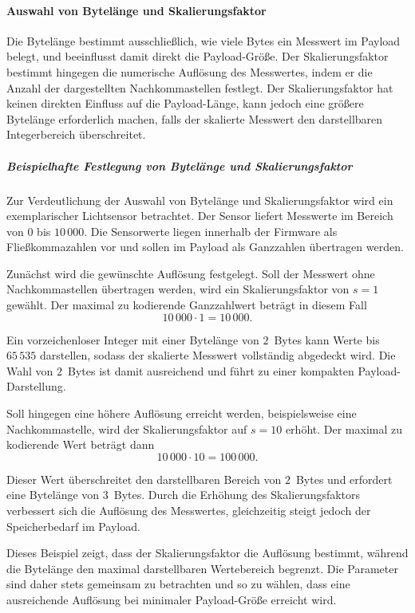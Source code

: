 \paragraph{Auswahl von Bytelänge und Skalierungsfaktor \label{data:deviceProfileConfig}}
	Die Bytelänge bestimmt ausschlie{\ss}lich, wie viele Bytes ein Messwert im Payload belegt, und beeinflusst damit direkt die Payload-Grö{\ss}e. Der Skalierungsfaktor bestimmt hingegen die numerische Auflösung des Messwertes, indem er die Anzahl der dargestellten Nachkommastellen festlegt. Der Skalierungsfaktor hat keinen direkten Einfluss auf die Payload-Länge, kann jedoch eine grö{\ss}ere Bytelänge erforderlich machen, falls der skalierte Messwert den darstellbaren Integerbereich überschreitet.

\subparagraph{Beispielhafte Festlegung von Bytelänge und Skalierungsfaktor}

	Zur Verdeutlichung der Auswahl von Bytelänge und Skalierungsfaktor wird ein exemplarischer Lichtsensor betrachtet. Der Sensor liefert Messwerte im Bereich von $0$ bis $10\,000$. Die Sensorwerte liegen innerhalb der Firmware als Flie{\ss}kommazahlen vor und sollen im Payload als Ganzzahlen übertragen werden.
	
	Zunächst wird die gewünschte Auflösung festgelegt. Soll der Messwert ohne Nachkommastellen übertragen werden, wird ein Skalierungsfaktor von $s = 1$ gewählt. Der maximal zu kodierende Ganzzahlwert beträgt in diesem Fall
	\[
	10\,000 \cdot 1 = 10\,000.
	\]
	
	Ein vorzeichenloser Integer mit einer Bytelänge von $2$~Bytes kann Werte bis $65\,535$ darstellen, sodass der skalierte Messwert vollständig abgedeckt wird. Die Wahl von $2$~Bytes ist damit ausreichend und führt zu einer kompakten Payload-Darstellung.
	
	Soll hingegen eine höhere Auflösung erreicht werden, beispielsweise eine Nachkommastelle, wird der Skalierungsfaktor auf $s = 10$ erhöht. Der maximal zu kodierende Wert beträgt dann
	\[
	10\,000 \cdot 10 = 100\,000.
	\]
	
	Dieser Wert überschreitet den darstellbaren Bereich von $2$~Bytes und erfordert eine Bytelänge von $3$~Bytes. Durch die Erhöhung des Skalierungsfaktors verbessert sich die Auflösung des Messwertes, gleichzeitig steigt jedoch der Speicherbedarf im Payload.
	
	Dieses Beispiel zeigt, dass der Skalierungsfaktor die Auflösung bestimmt, während die Bytelänge den maximal darstellbaren Wertebereich begrenzt. Die Parameter sind daher stets gemeinsam zu betrachten und so zu wählen, dass eine ausreichende Auflösung bei minimaler Payload-Grö{\ss}e erreicht wird.

